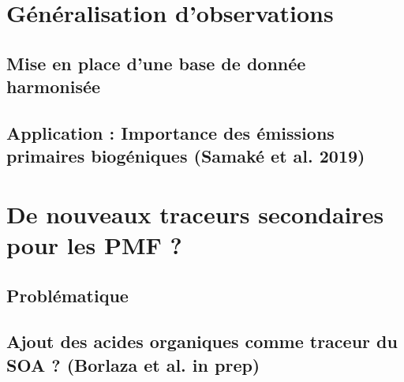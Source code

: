 

\section{Généralisation d'observations}%
\label{sec:généralisation_dobservations}

\subsection{Mise en place d'une base de donnée harmonisée}%
\label{sub:mise_en_place_d_une_base_de_donnée_harmonisée}

\subsection{Application : Importance des émissions primaires biogéniques (Samaké et al.
2019)}%

\label{sub:application_importance_des_émissions_primaires_biogéniques_samaké_et_al_2019_}


\section{De nouveaux traceurs secondaires pour les PMF ?}%
\label{sec:amélioration_des_solutions_pmf_grâce_à_de_nouveaux_traceurs_organiques}

\subsection{Problématique}%
\label{sub:problématique}

\subsection{Ajout des acides organiques comme traceur du SOA ? (Borlaza et al. in prep)}%
\label{sub:ajout_des_acides_organiques_comme_traceur_du_soa_borlaza_et_al_in_prep_}




\printbibliography[segment=\therefsegment,heading=subbibliography]
